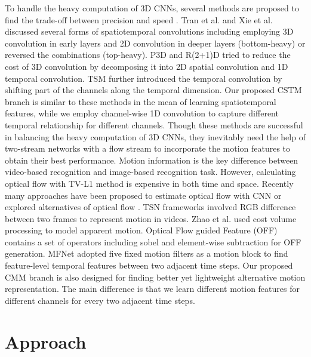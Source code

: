 \documentclass[10pt,twocolumn,letterpaper]{article}
\begin{document}
	To handle the heavy computation of 3D CNNs, several methods are proposed to find the trade-off between precision and speed \cite{tran2018closer,xie2018rethinking,zolfaghari2018eco,zhou2018mict,sun2015human,qiu2017learning}. Tran et al. \cite{tran2018closer} and Xie et al. \cite{xie2018rethinking} discussed several forms of spatiotemporal convolutions including employing 3D convolution in early layers and 2D convolution in deeper layers (bottom-heavy) or reversed the combinations (top-heavy). P3D \cite{qiu2017learning} and R(2+1)D \cite{tran2018closer} tried to reduce the cost of 3D convolution by decomposing it into 2D spatial convolution and 1D temporal convolution.  TSM \cite{lin2018temporal} further introduced the temporal convolution by shifting part of the channels along the temporal dimension. Our proposed CSTM branch is similar to these methods in the mean of learning spatiotemporal features, while we employ channel-wise 1D convolution to capture different temporal relationship for different channels. Though these methods are successful in balancing the heavy computation of 3D CNNs, they inevitably need the help of two-stream networks with a flow stream to incorporate the motion features to obtain their best performance. Motion information is the key difference between video-based recognition and image-based recognition task. However, calculating optical flow with TV-L1 method \cite{zach2007duality} is expensive in both time and space. Recently many approaches have been proposed to estimate optical flow with CNN \cite{dosovitskiy2015flownet,ilg2017flownet,fan2018end,ranjan2017optical} or explored alternatives of optical flow \cite{wang2016temporal, zhao2018recognize, sun2018optical, lee2018motion}. TSN frameworks \cite{wang2016temporal} involved RGB difference between two frames to represent motion in videos. Zhao et al. \cite{zhao2018recognize} used cost volume processing to model apparent motion. Optical Flow guided Feature (OFF) \cite{sun2018optical} contains a set of operators including sobel and element-wise subtraction for OFF generation. MFNet \cite{lee2018motion} adopted five fixed motion filters as a motion block to find feature-level temporal features between two adjacent time steps. Our proposed CMM branch is also designed for finding better yet lightweight alternative motion representation. The main difference is that we learn different motion features for different channels for every two adjacent time steps.
	


	\section{Approach}
	
\end{document}
